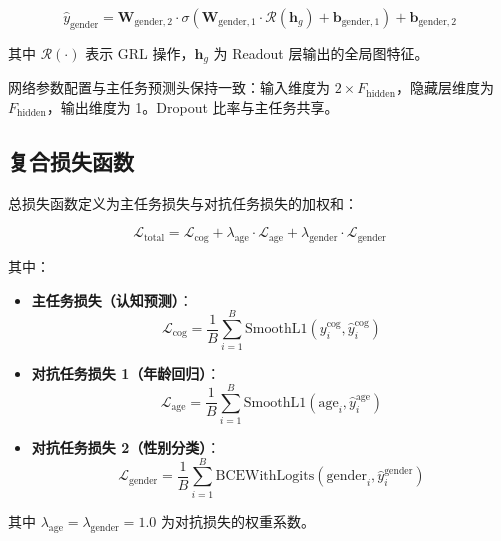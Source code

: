 \documentclass[UTF8, a4paper, 12pt]{article}
\begin{document}
\begin{equation}
\hat{y}_{\text{gender}} = \mathbf{W}_{\text{gender},2} \cdot \sigma\left( \mathbf{W}_{\text{gender},1} \cdot \mathcal{R}(\mathbf{h}_g) + \mathbf{b}_{\text{gender},1} \right) + \mathbf{b}_{\text{gender},2}
\end{equation}

其中 $\mathcal{R}(\cdot)$ 表示 GRL 操作，$\mathbf{h}_g$ 为 Readout 层输出的全局图特征。

网络参数配置与主任务预测头保持一致：输入维度为 $2 \times F_{\text{hidden}}$，隐藏层维度为 $F_{\text{hidden}}$，输出维度为 1。Dropout 比率与主任务共享。

\subsection{复合损失函数}

总损失函数定义为主任务损失与对抗任务损失的加权和：

\begin{equation}
\mathcal{L}_{\text{total}} = \mathcal{L}_{\text{cog}} + \lambda_{\text{age}} \cdot \mathcal{L}_{\text{age}} + \lambda_{\text{gender}} \cdot \mathcal{L}_{\text{gender}}
\end{equation}

其中：

\begin{itemize}
    \item \textbf{主任务损失（认知预测）}：
    \begin{equation}
    \mathcal{L}_{\text{cog}} = \frac{1}{B} \sum_{i=1}^{B} \text{SmoothL1}(y_i^{\text{cog}}, \hat{y}_i^{\text{cog}})
    \end{equation}

    \item \textbf{对抗任务损失 1（年龄回归）}：
    \begin{equation}
    \mathcal{L}_{\text{age}} = \frac{1}{B} \sum_{i=1}^{B} \text{SmoothL1}(\text{age}_i, \hat{y}_i^{\text{age}})
    \end{equation}

    \item \textbf{对抗任务损失 2（性别分类）}：
    \begin{equation}
    \mathcal{L}_{\text{gender}} = \frac{1}{B} \sum_{i=1}^{B} \text{BCEWithLogits}(\text{gender}_i, \hat{y}_i^{\text{gender}})
    \end{equation}
\end{itemize}

其中 $\lambda_{\text{age}} = \lambda_{\text{gender}} = 1.0$ 为对抗损失的权重系数。
\end{document}
